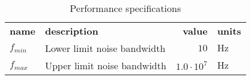 \begin{table}[H]
\centering
\begin{tabular}[c]{llrl}
\textbf{name} & \textbf{description} & \textbf{value} & \textbf{units} \\ 
\rowcolor{myyellow}
$f_{min}$ &\small{Lower limit noise bandwidth} &$10$ &$\mathrm{Hz}$ \\ 
$f_{max}$ &\small{Upper limit noise bandwidth} &$1.0 \cdot 10^{7}$ &$\mathrm{Hz}$ \\ 
\end{tabular}
\caption{Performance specifications}
\label{tab-performance}
\end{table}



